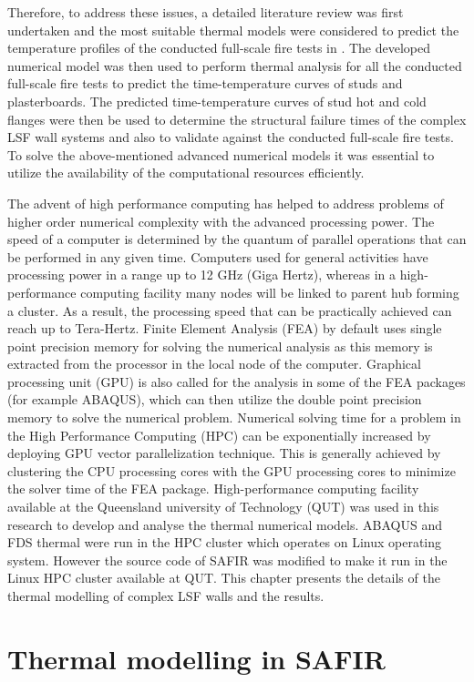 Therefore, to address these issues, a detailed literature review was first undertaken and the most suitable thermal models were considered to predict the temperature profiles of the conducted full-scale fire tests in . The developed numerical model was then used to perform thermal analysis for all the conducted full-scale fire tests to predict the time-temperature curves of studs and plasterboards. The predicted time-temperature curves of stud hot and cold flanges were then be used to determine the structural failure times of the complex LSF wall systems and also to validate against the conducted full-scale fire tests. To solve the above-mentioned advanced numerical models it was essential to utilize the availability of the computational resources efficiently. 

The advent of high performance computing has helped to address problems of higher order numerical complexity with the advanced processing power. The speed of a computer is determined by the quantum of parallel operations that can be performed in any given time. Computers used for general activities have processing power in a range up to 12 GHz (Giga Hertz), whereas in a high-performance computing facility many nodes will be linked to parent hub forming a cluster. As a result, the processing speed that can be practically achieved can reach up to Tera-Hertz. Finite Element Analysis (FEA) by default uses single point precision memory for solving the numerical analysis as this memory is extracted from the processor in the local node of the computer. Graphical processing unit (GPU) is also called for the analysis in some of the FEA packages (for example ABAQUS), which can then utilize the double point precision memory to solve the numerical problem. Numerical solving time for a problem in the High Performance Computing (HPC) can be exponentially increased by deploying GPU vector parallelization technique. This is generally achieved by clustering the CPU processing cores with the GPU processing cores to minimize the solver time of the FEA package. High-performance computing facility available at the Queensland university of Technology (QUT) was used in this research to develop and analyse the thermal numerical models. ABAQUS and FDS thermal were run in the HPC cluster which operates on Linux operating system. However the source code of SAFIR was modified to make it run in the Linux HPC cluster available at QUT. This chapter presents the details of the thermal modelling of complex LSF walls and the results.

\section{Thermal modelling in SAFIR}

